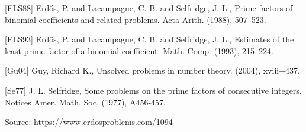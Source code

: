 \documentclass{article}
\begin{document}
[ELS88] Erd\H{o}s, P. and Lacampagne, C. B. and Selfridge, J. L., Prime factors of binomial coefficients and related problems. Acta Arith. (1988), 507--523.
 
 [ELS93] Erd\H{o}s, P. and Lacampagne, C. B. and Selfridge, J. L., Estimates of the least prime factor of a binomial coefficient. Math. Comp. (1993), 215--224.
 
 [Gu04] Guy, Richard K., Unsolved problems in number theory. (2004), xviii+437.
 
 [Se77] J. L. Selfridge, Some problems on the prime factors of consecutive integers. Notices Amer. Math. Soc. (1977), A456-457.

\bigskip
\noindent\small{Source: \url{https://www.erdosproblems.com/1094}}
\end{document}
